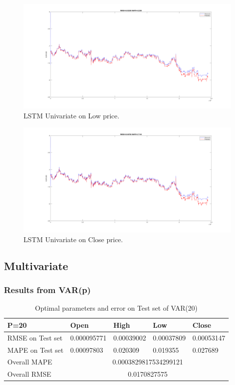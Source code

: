 \documentclass[11pt]{article}
\begin{document}
\begin{figure}[H]
  \centering
  \includegraphics[width=\linewidth,keepaspectratio]{figs/lstm_uni_low.png}
  \caption{LSTM Univariate on Low price.}
\end{figure}

\begin{figure}[H]
  \centering
  \includegraphics[width=\linewidth,keepaspectratio]{figs/lstm_uni_close.png}
  \caption{LSTM Univariate on Close price.}
\end{figure}


\subsection{Multivariate}
\subsubsection{Results from VAR(p)}
\begin{table}[H]
  \centering
\begin{tabular}{|l|l|l|l|l|}
  \hline
  P=20             & Open        & High       & Low        & Close      \\ \hline
  RMSE on Test set & 0.000095771 & 0.00039002 & 0.00037809 & 0.00053147 \\ \hline
  MAPE on Test set & 0.00097803  & 0.020309   & 0.019355   & 0.027689   \\ \hline
  Overall MAPE     & \multicolumn{4}{c|}{0.0003829817534299121}         \\ \hline
  Overall RMSE     & \multicolumn{4}{c|}{0.0170827575}                  \\ \hline
\end{tabular}
\caption{Optimal parameters and error on Test set of VAR(20)}
\end{table}
\end{document}
